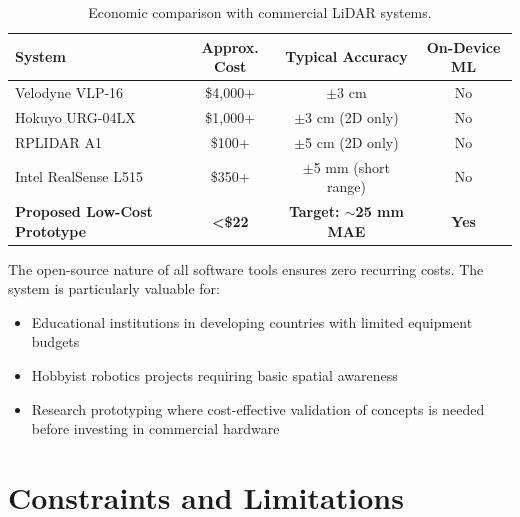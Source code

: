 \documentclass[12pt,a4paper]{article}
\begin{document}
    \begin{table}[H]
    \centering
    \caption{Economic comparison with commercial LiDAR systems.}
    \label{tab:economic_comparison}
    \small
    \begin{tabularx}{\textwidth}{|X|c|c|c|}
    \hline
    \textbf{System} & \textbf{Approx. Cost} & \textbf{Typical Accuracy} & \textbf{On-Device ML} \\
    \hline
    Velodyne VLP-16 & \$4,000+ & $\pm$3 cm & No \\
    \hline
    Hokuyo URG-04LX & \$1,000+ & $\pm$3 cm (2D only) & No \\
    \hline
    RPLIDAR A1 & \$100+ & $\pm$5 cm (2D only) & No \\
    \hline
    Intel RealSense L515 & \$350+ & $\pm$5 mm (short range) & No \\
    \hline
    \textbf{Proposed Low-Cost Prototype} & \textbf{<\$22} & \textbf{Target: $\sim$25 mm MAE} & \textbf{Yes} \\
    \hline
    \end{tabularx}
    \end{table}

    The open-source nature of all software tools ensures zero recurring costs. The system is particularly valuable for:
    \begin{itemize}[leftmargin=0.35in]
        \item Educational institutions in developing countries with limited equipment budgets
        \item Hobbyist robotics projects requiring basic spatial awareness
        \item Research prototyping where cost-effective validation of concepts is needed before investing in commercial hardware
    \end{itemize}



    \section{Constraints and Limitations}
\end{document}
